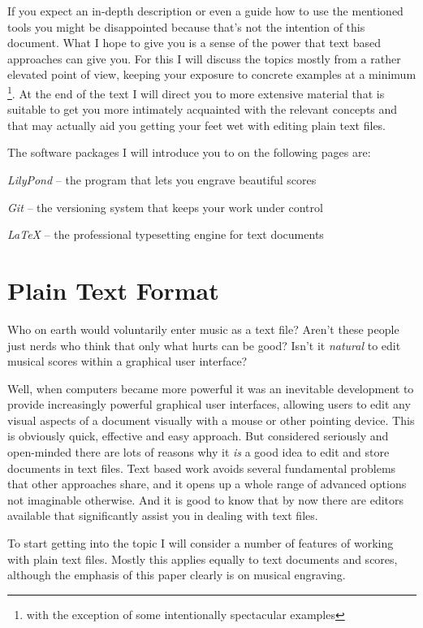 \documentclass[../../LilyPond-Tutorials]{subfiles}
\begin{document}
If you expect an in-depth description or even a guide how to use the mentioned tools you might be disappointed because that's not the intention of this document.
What I hope to give you is a sense of the power that text based approaches can give you.
For this I will discuss the topics mostly from a rather elevated point of view, keeping your exposure to concrete examples at a minimum%
\footnote{with the exception of some intentionally spectacular examples}.
At the end of the text I will direct you to more extensive material that is suitable to get you more intimately acquainted with the relevant concepts and that may actually aid you getting your feet wet with editing plain text files.

The software packages I will introduce you to on the following pages are:
\begin{itemize*}
\item \emph{LilyPond} -- the program that lets you engrave beautiful scores
\item \emph{Git} -- the versioning system that keeps your work under control
\item \emph{\LaTeX} -- the professional typesetting engine for text documents
\end{itemize*}

\chapter{Plain Text Format}
\label{chap:pt_plain-text-format}
Who on earth would voluntarily enter music as a text file?
Aren't these people just nerds who think that only what hurts can be good?
Isn't it \emph{natural} to edit musical scores within a graphical user interface?

Well, when computers became more powerful it was an inevitable development to provide increasingly powerful graphical user interfaces, allowing users to edit any visual aspects of a document visually with a mouse or other pointing device.
This is obviously quick, effective and easy approach.
But considered seriously and open-minded there are lots of reasons why it \emph{is} a good idea to edit and store documents in text files.
Text based work avoids several fundamental problems that other approaches share, and it opens up a whole range of advanced options not imaginable otherwise.
And it is good to know that by now there are editors available that significantly assist you in dealing with text files.

To start getting into the topic I will consider a number of features of working with plain text files.
Mostly this applies equally to text documents and scores, although the emphasis of this paper clearly is on musical engraving.
\end{document}
